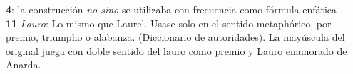 
\noindent \textbf{4}: la construcción \textit{no sino} se utilizaba con frecuencia como fórmula enfática\\
\noindent \textbf{11} \textit{Lauro}: Lo mismo que Laurel. Usase solo en el sentido metaphórico, por premio, triumpho o alabanza. (Diccionario de autoridades). La mayúscula del original juega con doble sentido del lauro como premio y Lauro enamorado de Anarda.
